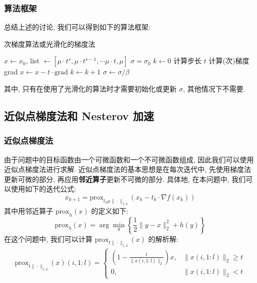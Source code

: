 \documentclass{article}
\begin{document}
\subsubsection{算法框架}
总结上述的讨论, 我们可以得到如下的算法框架:
\begin{algorithm}
    \caption{次梯度算法或光滑化的梯度法}
    \begin{algorithmic}
        \State $x \gets x_0$, list $\gets [\mu\cdot t^s, \mu\cdot t^{s-1}, \cdots \mu \cdot t, \mu]$ 
        \State $\sigma = \sigma_0$ 
        \State $k \gets 0$
        \State 计算步长 $t$
        \State 计算(次)梯度 grad
        \State $x \gets x - t \cdot \text{grad}$ 
        \State $k \gets k + 1$
        \EndWhile
        \State $\sigma \gets \sigma / \beta$ 
        \EndFor
    \end{algorithmic}
    \label{alg:gd}
\end{algorithm}
\newline
其中, 只有在使用了光滑化的算法时才需要初始化或更新 $\sigma$, 其他情况下不需要.

\subsection{近似点梯度法和 Nesterov 加速}

\subsubsection{近似点梯度法}
由于问题中的目标函数由一个可微函数和一个不可微函数组成, 因此我们可以使用近似点梯度法进行求解. 近似点梯度法的基本思想是在每次迭代中, 先使用梯度法更新可微的部分, 再应用\textbf{邻近算子}更新不可微的部分. 具体地, 在本问题中, 我们可以使用如下的迭代公式:
\begin{equation*}
    x_{k+1} = \text{prox}_{t_k\mu\|\cdot\|_{1,2}}(x_k - t_k \cdot \nabla f(x_k))
\end{equation*}
其中用邻近算子 $\text{prox}_h(x)$ 的定义如下:
\begin{equation*}
    \text{prox}_h(x) = \arg\min_y \left\{\frac{1}{2}\|y - x\|_2^2 + h(y)
    \right\}
\end{equation*}
在这个问题中, 我们可以计算 $\text{prox}_{t\|\cdot\|_{1,2}}(x)$ 的解析解:
\begin{equation*}
    \text{prox}_{t\|\cdot\|_{1,2}}(x)(i,1:l) =
    \begin{cases}
        \left(1-\frac{t}{\|x(i,1:l)\|_2}\right)x, & \|x(i,1:l)\|_2 \ge t\\
        0, & \|x(i,1:l)\|_2 < t
    \end{cases}
\end{equation*}
\end{document}
